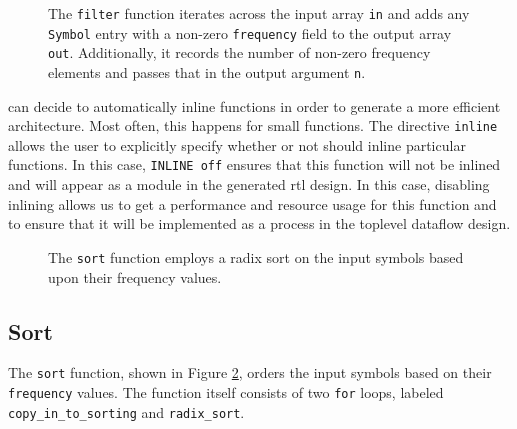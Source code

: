 \begin{figure}

\caption{  The \lstinline{filter} function iterates across the input array \lstinline{in} and adds any \lstinline{Symbol} entry with a non-zero \lstinline{frequency} field to the output array \lstinline{out}. Additionally, it records the number of non-zero frequency elements and passes that in the output argument \lstinline{n}.  }
\label{fig:huffman_filter.cpp}
\end{figure}

\begin{aside}
\VHLS can decide to automatically inline functions in order to generate a more efficient architecture. Most often, this happens for small functions.  The directive \lstinline{inline} allows the user to explicitly specify whether or not \VHLS should inline particular functions. In this case, \lstinline{INLINE off} ensures that this function will not be inlined and will appear as a module in the generated \gls{rtl} design. In this case, disabling inlining allows us to get a performance and resource usage for this function and to ensure that it will be implemented as a process in the toplevel dataflow design.
\end{aside}

%

\begin{figure}

\end{figure}
\begin{figure}

\caption{  The \lstinline{sort} function employs a radix sort on the input symbols based upon their frequency values. }
\label{fig:huffman_sort.cpp}
\end{figure}

\subsection{Sort}

The \lstinline{sort} function, shown in Figure \ref{fig:huffman_sort.cpp}, orders the input symbols based on their \lstinline{frequency} values. The function itself consists of two \lstinline{for} loops, labeled \lstinline{copy_in_to_sorting} and \lstinline{radix_sort}. 

